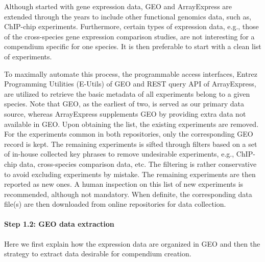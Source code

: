 Although started with gene expression data, GEO and ArrayExpress are extended through the years to include other functional genomics data, such as, ChIP-chip experiments. Furthermore, certain types of expression data, e.g., those of the cross-species gene expression comparison studies, are not interesting for a compendium specific for one species. It is then preferable to start with a clean list of experiments.

To maximally automate this process, the programmable access interfaces, Entrez Programming Utilities (E-Utils) of GEO and REST query API of ArrayExpress, are utilized to retrieve the basic metadata of all experiments belong to a given species. Note that GEO, as the earliest of two, is served as our primary data source, whereas ArrayExpress supplements GEO by providing extra data not available in GEO. Upon obtaining the list, the existing experiments are removed.  For the experiments common in both repositories, only the corresponding GEO record is kept. The remaining experiments is sifted through filters based on a set of in-house collected key phrases to remove undesirable experiments, e.g., ChIP-chip data, cross-species comparison data, etc. The filtering is rather conservative to avoid excluding experiments by mistake. The remaining experiments are then reported as new ones.  A human inspection on this list of new experiments is recommended, although not mandatory. When definite, the corresponding data file(s) are then downloaded from online repositories for data collection.        


\paragraph{Step 1.2: GEO data extraction} Here we first explain how the expression data are organized in GEO and then the strategy to extract data desirable for compendium creation. 


